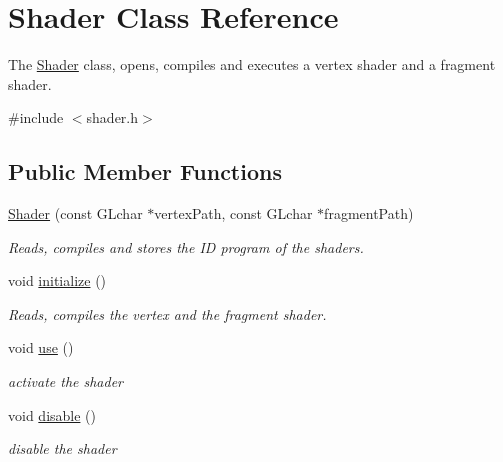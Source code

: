\hypertarget{class_shader}{}\section{Shader Class Reference}
\label{class_shader}


The \mbox{\hyperlink{class_shader}{Shader}} class, opens, compiles and executes a vertex shader and a fragment shader.  




{\ttfamily \#include $<$shader.\+h$>$}

\subsection*{Public Member Functions}
\begin{DoxyCompactItemize}
\item 
\mbox{\hyperlink{class_shader_a03421a8419cdad4b84cf58ecdb156879}{Shader}} (const G\+Lchar $\ast$vertex\+Path, const G\+Lchar $\ast$fragment\+Path)
\begin{DoxyCompactList}\small\item\em Reads, compiles and stores the ID program of the shaders. \end{DoxyCompactList}\item 
\mbox{\label{class_shader_a1712a23e6282d4cec7d95216bde65f6a}} 
void \mbox{\hyperlink{class_shader_a1712a23e6282d4cec7d95216bde65f6a}{initialize}} ()
\begin{DoxyCompactList}\small\item\em Reads, compiles the vertex and the fragment shader. \end{DoxyCompactList}\item 
\mbox{\label{class_shader_a870fa9f13d69e558815d6fd351a469dc}} 
void \mbox{\hyperlink{class_shader_a870fa9f13d69e558815d6fd351a469dc}{use}} ()
\begin{DoxyCompactList}\small\item\em activate the shader \end{DoxyCompactList}\item 
\mbox{\label{class_shader_ad8368fcacdb176733217c6a15f3ad543}} 
void \mbox{\hyperlink{class_shader_ad8368fcacdb176733217c6a15f3ad543}{disable}} ()
\begin{DoxyCompactList}\small\item\em disable the shader \end{DoxyCompactList}\item 

\end{DoxyCompactItemize}
